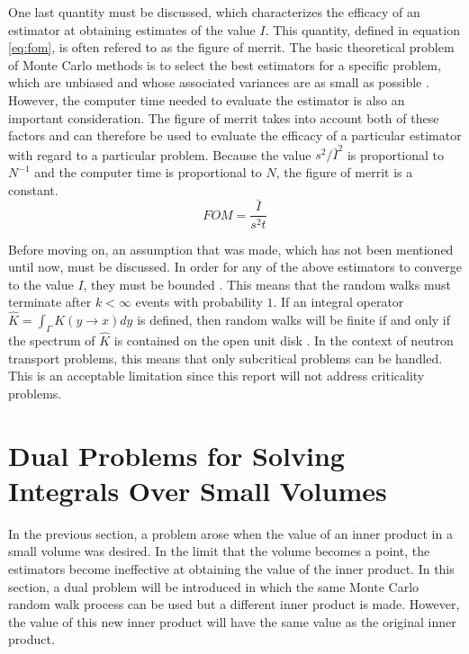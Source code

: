 One last quantity must be discussed, which characterizes the efficacy of
an estimator at obtaining estimates of the value $I$. This quantity, defined
in equation \ref{eq:fom}, is often refered to as the figure of merrit. The
basic theoretical problem of Monte Carlo methods is to select the best
estimators for a specific problem, which are unbiased and whose associated
variances are as small as possible \citep{spanier_monte_1969}. However, the 
computer time needed to evaluate the estimator is also an important 
consideration. The figure of merrit takes into account both of these factors
and can therefore be used to evaluate the efficacy of a particular estimator
with regard to a particular problem. Because the value $s^2/\bar{I}^2$ is
proportional to $N^{-1}$ and the computer time is proportional to $N$, the
figure of merrit is a constant.
\begin{equation}
  FOM = \frac{\bar{I}}{s^2t}
  \label{eq:fom}
\end{equation}

Before moving on, an assumption that was made, which has not been mentioned
until now, must be discussed. In order for any of the above estimators to 
converge to the value $I$, they must be bounded \citep{spanier_monte_1969}. This
means that the random walks must terminate after $k < \infty$ events with 
probability $1$. If an integral operator $\hat{K} = \int_{\Gamma} K(y \to x)dy$ 
is defined, then random walks will be finite if and only if the spectrum of
$\hat{K}$ is contained on the open unit disk \citep{spanier_monte_1969}. 
In the context of neutron transport problems, this means that only subcritical
problems can be handled. This is an acceptable limitation since this report 
will not address criticality problems.

\section{Dual Problems for Solving Integrals Over Small Volumes}
\label{sec:dual_problems}
In the previous section, a problem arose when the value of an inner product
in a small volume was desired. In the limit that the volume becomes a point,
the estimators become ineffective at obtaining the value of the inner product.
In this section, a dual problem will be introduced in which the same Monte
Carlo random walk process can be used but a different inner product is made.
However, the value of this new inner product will have the same value as the
original inner product. 

